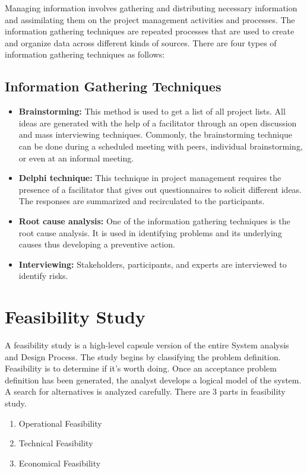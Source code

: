 \documentclass[12pt, a4paper]{report}
\begin{document}
\par Managing information involves gathering and distributing necessary information and assimilating them on the project management activities and processes. The information gathering techniques are repeated processes that are used to create and organize data across different kinds of sources. There are four types of information gathering techniques as follows:
\subsection{Information Gathering Techniques}
\begin{itemize}
	\item \textbf{Brainstorming:} This method is used to get a list of all project lists. All ideas are generated with the help of a facilitator through an open discussion and mass interviewing techniques. Commonly, the brainstorming technique can be done during a scheduled meeting with peers, individual brainstorming, or even at an informal meeting.
	\item \textbf{Delphi technique:} This technique in project management requires the presence of a facilitator that gives out questionnaires to solicit different ideas. The responses are summarized and recirculated to the participants.
	\item \textbf{Root cause analysis:} One of the information gathering techniques is the root cause analysis. It is used in identifying problems and its underlying causes thus developing a preventive action.
	\item \textbf{Interviewing:} Stakeholders, participants, and experts are interviewed to identify risks.
\end{itemize}

\newpage
\section{Feasibility Study}
\par A feasibility study is a high-level capsule version of the entire System analysis and Design Process.
The study begins by classifying the problem definition. Feasibility is to determine if it’s worth
doing. Once an acceptance problem definition has been generated, the analyst develops a logical
model of the system. A search for alternatives is analyzed carefully. There are 3 parts in feasibility
study.
\begin{enumerate}
	\item Operational Feasibility
	\item Technical Feasibility
	\item Economical Feasibility
\end{enumerate}
\end{document}

